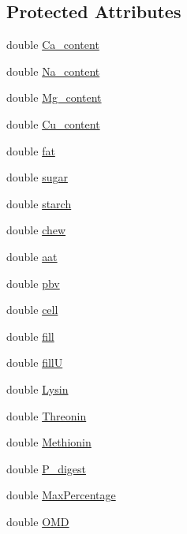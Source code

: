 \subsection*{Protected Attributes}
\begin{DoxyCompactItemize}
\item 
double \hyperlink{classfeed_item_ac788c820b5c7d3312930d93c26dad5b0}{Ca\_\-content}
\item 
double \hyperlink{classfeed_item_a502f94112d21a2ce72fa9236f627453c}{Na\_\-content}
\item 
double \hyperlink{classfeed_item_ac47eaa252e721c423a64258bf42feecd}{Mg\_\-content}
\item 
double \hyperlink{classfeed_item_a765c2b8d1d72ca2b57d0c2a798ef1741}{Cu\_\-content}
\item 
double \hyperlink{classfeed_item_a8bb7f5be1c2a911ce61015c4e2a2fdb4}{fat}
\item 
double \hyperlink{classfeed_item_a0c724ea2e335d283f04a717de7f3eb4d}{sugar}
\item 
double \hyperlink{classfeed_item_aab4b5a23a38d01c1494923072e5b3991}{starch}
\item 
double \hyperlink{classfeed_item_a7f5463568597590e951205e68bec8d86}{chew}
\item 
double \hyperlink{classfeed_item_a68a4482387c13fa8cddaae7b6f57eb41}{aat}
\item 
double \hyperlink{classfeed_item_aaf7dbc38398df3f6d73927d6a797b417}{pbv}
\item 
double \hyperlink{classfeed_item_a533e749e1e0a2dea338621c1a3b926dd}{cell}
\item 
double \hyperlink{classfeed_item_a3210be35981756a25d53371ed71867e0}{fill}
\item 
double \hyperlink{classfeed_item_a856e7c00740acebd3daadfadcd87054f}{fillU}
\item 
double \hyperlink{classfeed_item_ab969699325da0b1d3c5a24418d979d64}{Lysin}
\item 
double \hyperlink{classfeed_item_a1e32708aa4bf0d21ef5a3f7e913164d8}{Threonin}
\item 
double \hyperlink{classfeed_item_a056337f342f7ce38f626edaee5b289b4}{Methionin}
\item 
double \hyperlink{classfeed_item_a1c4362b35420029a919106eefaf07812}{P\_\-digest}
\item 
double \hyperlink{classfeed_item_ad14c160732a996add59bcd5982f85ae0}{MaxPercentage}
\item 
double \hyperlink{classfeed_item_a6ad62b61a9aafd6e7b11e42747e06a6f}{OMD}

\end{DoxyCompactItemize}
